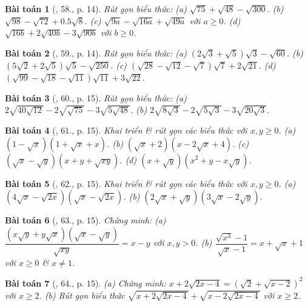 \documentclass{article}
\newtheorem{baitoan}{Bài toán}
\begin{document}
\begin{baitoan}[\cite{SBT_Toan_9_tap_1}, 58., p. 14]
	Rút gọn biểu thức: (a) $\sqrt{75} + \sqrt{48} - \sqrt{300}$. (b) $\sqrt{98} - \sqrt{72} + 0.5\sqrt{8}$. (c) $\sqrt{9a} - \sqrt{16a} + \sqrt{49a}$ với $a\ge0$. (d) $\sqrt{16b} + 2\sqrt{40b} - 3\sqrt{90b}$ với $b\ge0$.
\end{baitoan}

\begin{baitoan}[\cite{SBT_Toan_9_tap_1}, 59., p. 14]
	Rút gọn biểu thức: (a) $(2\sqrt{3} + \sqrt{5})\sqrt{3} - \sqrt{60}$. (b) $(5\sqrt{2} + 2\sqrt{5})\sqrt{5} - \sqrt{250}$. (c) $(\sqrt{28} - \sqrt{12} - \sqrt{7})\sqrt{7} + 2\sqrt{21}$. (d) $(\sqrt{99} - \sqrt{18} - \sqrt{11})\sqrt{11} + 3\sqrt{22}$.
\end{baitoan}

\begin{baitoan}[\cite{SBT_Toan_9_tap_1}, 60., p. 15]
	Rút gọn biểu thức: (a) $2\sqrt{40\sqrt{12}} - 2\sqrt{\sqrt{75}} - 3\sqrt{5\sqrt{48}}$. (b) $2\sqrt{8\sqrt{3}} - 2\sqrt{5\sqrt{3}} - 3\sqrt{20\sqrt{3}}$. 
\end{baitoan}

\begin{baitoan}[\cite{SBT_Toan_9_tap_1}, 61., p. 15]
	Khai triển \& rút gọn các biểu thức với $x,y\ge0$. (a) $(1 - \sqrt{x})(1 + \sqrt{x} + x)$. (b) $(\sqrt{x} + 2)(x - 2\sqrt{x} + 4)$. (c) $(\sqrt{x} - \sqrt{y})(x + y + \sqrt{xy})$. (d) $(x + \sqrt{y})(x^2 + y - x\sqrt{y})$.
\end{baitoan}

\begin{baitoan}[\cite{SBT_Toan_9_tap_1}, 62., p. 15]
		Khai triển \& rút gọn các biểu thức với $x,y\ge0$. (a) $(4\sqrt{x} - \sqrt{2x})(\sqrt{x} - \sqrt{2x})$. (b) $(2\sqrt{x} + \sqrt{y})(3\sqrt{x} - 2\sqrt{y})$.
\end{baitoan}

\begin{baitoan}[\cite{SBT_Toan_9_tap_1}, 63., p. 15]
	Chứng minh: (a) $\dfrac{(x\sqrt{y} + y\sqrt{x})(\sqrt{x} - \sqrt{y})}{\sqrt{xy}} = x - y$ với $x,y > 0$. (b) $\dfrac{\sqrt{x^3} - 1}{\sqrt{x} - 1} = x + \sqrt{x} + 1$ với $x\ge0$ \& $x\ne1$.
\end{baitoan}

\begin{baitoan}[\cite{SBT_Toan_9_tap_1}, 64., p. 15]
	(a) Chứng minh: $x + 2\sqrt{2x - 4} = (\sqrt{2} + \sqrt{x - 2})^2$ với $x\ge2$. (b) Rút gọn biểu thức $\sqrt{x + 2\sqrt{2x - 4}} + \sqrt{x - 2\sqrt{2x - 4}}$ với $x\ge2$.
\end{baitoan}
\end{document}
